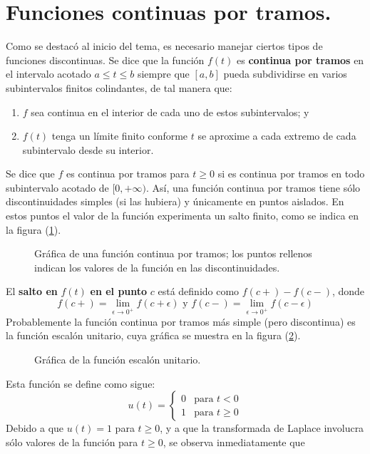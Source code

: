 \section{Funciones continuas por tramos.}
Como se destacó al inicio del tema, es necesario manejar ciertos tipos de funciones discontinuas. Se dice que la función $f(t)$ es \textbf{continua por tramos} en el intervalo acotado $a \leq t \leq b$ siempre que $[a, b]$ pueda subdividirse en varios subintervalos finitos colindantes, de tal manera que:
\begin{enumerate}
\item $f$ sea continua en el interior de cada uno de estos subintervalos; y
\item $f(t)$ tenga un límite finito conforme $t$ se aproxime a cada extremo de cada subintervalo desde su interior.
\end{enumerate}
Se dice que $f$ es continua por tramos para $t \geq 0$ si es continua por tramos en todo subintervalo acotado de $[0, +\infty)$. Así, una función continua por tramos tiene sólo discontinuidades simples (si las hubiera) y únicamente en puntos aislados. En estos puntos el valor de la función experimenta un salto finito, como se indica en la figura (\ref{fig:figura_001}).
\begin{figure}[H]
\centering

\caption{Gráfica de una función continua por tramos; los puntos rellenos indican los valores de la función en las discontinuidades.}
\label{fig:figura_001}
\end{figure}
 El \textbf{salto en} $f(t)$ \textbf{en el punto} $c$ está definido como $f(c+) - f(c-)$, donde
\[ f(c+) = \lim_{\epsilon \to 0^{+}} f (c + \epsilon) \mbox{ y } f(c-) = \lim_{\epsilon \to 0^{+}} f (c - \epsilon) \]
Probablemente la función continua por tramos más simple (pero discontinua) es la función escalón unitario, cuya gráfica se muestra en la figura (\ref{fig:figura_002}).
\begin{figure}[H]
\centering

\caption{Gráfica de la función escalón unitario.}
\label{fig:figura_002}
\end{figure}
Esta función se define como sigue:
\begin{equation}
u(t) = \begin{cases}
0 & \mbox{para } t < 0 \\
1 & \mbox{para } t \geq 0
\end{cases}
\label{eq:019}
\end{equation}
Debido a que $u(t) = 1$ para $t \geq 0$, y a que la transformada de Laplace involucra sólo valores de la función para $t \geq 0$, se observa inmediatamente que
